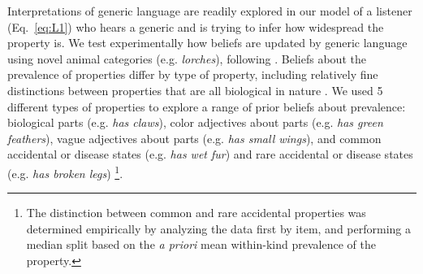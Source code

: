 \documentclass[10pt,letterpaper]{article}
\begin{document}
Interpretations of generic language are readily explored in our model of a listener (Eq.~\ref{eq:L1}) who hears a generic and is trying to infer how widespread the property is. 
We test experimentally how beliefs are updated by generic language using novel animal categories (e.g. \emph{lorches}), following 
.
Beliefs about the prevalence of properties differ by type of property, including relatively fine distinctions between properties that are all biological in nature \cite{Nisbett1983}. 
We used 5 different types of properties to explore a range of prior beliefs about prevalence: biological parts (e.g. \emph{has claws}), color adjectives about parts (e.g. \emph{has green feathers}), vague adjectives about parts (e.g. \emph{has small wings}), and common accidental or disease states (e.g. \emph{has wet fur}) and rare accidental or disease states (e.g. \emph{has broken legs}) \footnote{The distinction between common and rare accidental properties was determined empirically by analyzing the data first by item, and performing a median split based on the \emph{a priori} mean within-kind prevalence of the property.}.
\end{document}
